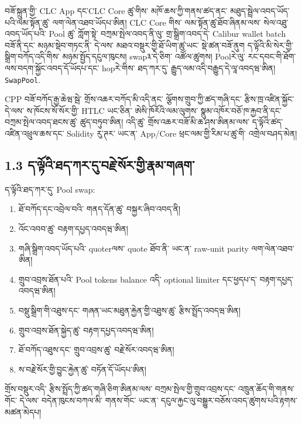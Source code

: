 \documentclass[11pt]{article}
\begin{document}
བཟོ་སྐྲུན་གྱི་ CLC App དང་CLC Core ཚུ་གིས་ མཁོ་ཆས་ཀྱི་གནས་ཚད་ནང་ མཐུད་སྦྲེལ་འབད་ཡོད་པའི་ལམ་སྟོན་ཚུ་ ལག་ལེན་འཐབ་ཡོདཔ་ཨིན། CLC Core གིས་ ལམ་སྟོན་ཚུ་ཐོབ་ཞིནམ་ལས་ སེལ་འཐུ་འབད་ཡོད་པའི་ Pool ཚུ་ ཀློག་སྟེ་ བཀྲམ་སྤེལ་འབད་ནི་ལུ་ གྲ་སྒྲིག་འབད་དེ་ Calibur wallet batch བཟོ་ནི་དང་ མཉམ་སྡེབ་གཏང་ནི་ དེ་ལས་ མཐའ་བསྡུར་གྱི་ཐོ་ཡིག་ཚུ་ཡང་ སྡེ་ཚན་བཟོ་ནུག ད་ལྟོའི་མི་སེར་གྱི་སྒྲིག་བཀོད་འདི་གིས་ མཉམ་སྤྱོད་དངུལ་ཁུངས། swap༣་དེ་ཅིག་ འཚོལ་ཚུགས། Poolརེ་ལུ་ རང་དབང་གི་ཐོག་ལས་བདག་སྐྱོང་འབད་དོ་ཡོདཔ་དང་ hopརེ་གིས་ ཐད་ཀར་དུ་ རྒྱུད་ལམ་འདི་བརྒྱུད་དེ་ལཱ་འབདཝ་ཨིན། \texttt{SwapPool}.

CPP བཟོ་བཀོད་རྒྱ་ཆེཝ་སྦེ་ གྲོས་འཆར་བཀོད་མི་འདི་ནང་ ལྕོགས་གྲུབ་ཀྱི་ཚད་གཞི་དང་ རྩིས་ཁྲ་འཛིན་སྐྱོང་ དེ་ལས་ ས་ཁོངས་སོ་སོར་གྱི་ HTLC ཡང་ཅིན་ ཨེསི་ཁོརོའི་ལམ་ལུགས་ སྣུམ་འཁོར་བཅོ་ཁ་རྐྱབ་ནི་དང་ བཀྲམ་སྤེལ་འབད་ཐངས་ཚུ་ ཚུད་བཏུབ་ཨིན། འདི་ཚུ་ གྲོས་འཆར་བཟོ་མི་ཆ་ཤས་ཨིནམ་ལས་ ད་ལྟོའི་ཚད་འཛིན་འཕྲུལ་ཆས་དང་ Solidity རུ་ཊར་ ཡང་ན་ App/Core ཕྲང་ལམ་གྱི་རིམ་པ་ཚུ་གི་ འགྲེལ་བཤད་མེན།

\subsection*{1.3 ད་ལྟོའི་ཐད་ཀར་དུ་བརྗེ་སོར་གྱི་རྣམ་གཞག་}

ད་ལྟོའི་ཐད་ཀར་དུ་ Pool swap:

\begin{enumerate}[leftmargin=*]
\item ཐོ་བཀོད་དང་འབྲེལ་བའི་ གནད་དོན་ཚུ་ བསྐྱར་ཞིབ་འབད་ནི།
\item འོང་འབབ་ཚུ་ བརྟག་དཔྱད་འབདཝ་ཨིན།
\item གཞི་སྒྲིག་འབད་ཡོད་པའི་ quoterལས་ quote ཐོབ་ནི་ ཡང་ན་ raw-unit parity ལག་ལེན་འཐབ་ཨིན།
\item གྲུབ་འབྲས་ཐོན་པའི་ Pool tokens balance འདི་ optional limiter དང་ཕྱདཔ་ད་ བརྟག་དཔྱད་འབདཝ་ཨིན།
\item བསྡུ་སྒྲིག་གི་འཐུས་དང་ གཞན་ཡང་མཐུན་རྐྱེན་གྱི་འཐུས་ཚུ་ རྩིས་སྤྲོད་འབདཝ་ཨིན།
\item གྲུབ་འབྲས་ཐོན་སྐྱེད་ཚུ་ བརྟག་དཔྱད་འབདཝ་ཨིན།
\item ཐོ་བཀོད་འཐུས་དང་ གྲུབ་འབྲས་ཚུ་ བརྗེ་སོར་འབདཝ་ཨིན།
\item ས་བརྗེ་སོར་གྱི་བྱུང་རྐྱེན་ཚུ་ བཏོན་དོ་ཡོདཔ་ཨིན།
\end{enumerate}
གྲོས་བསྡུར་འདི་ རྩིས་སྤྲོད་ཀྱི་ཚད་གཞི་ཅིག་ཨིནམ་ལས་ བཀྲམ་སྤེལ་གྱི་གྲུབ་འབྲས་དང་ འཁྲུན་ཆོད་གི་གནས་གོང་ དེ་ལས་ བདེན་ཁུངས་བཀལ་མི་ གནས་གོང་ ཡང་ན་ དངུལ་རྐྱང་ལུ་བསྒྱུར་བཅོས་འབད་ཚུགས་པའི་རྟགས་མཚན་མེདཔ།
\end{document}
